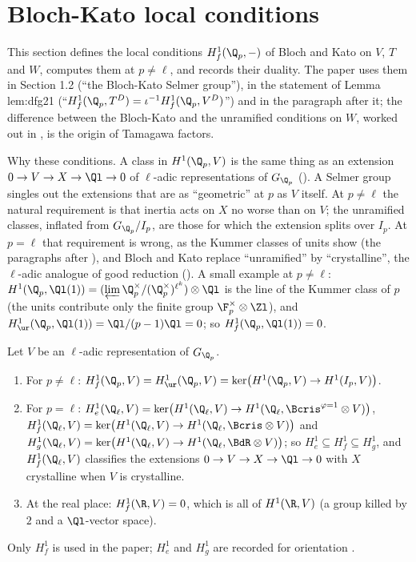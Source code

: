 \section{Bloch-Kato local conditions}\label{sec:blochkato:conditions}

This section defines the local conditions $H^1_f(\Q_p,-)$ of Bloch and Kato on $V$, $T$ and $W$, computes them at $p\ne\ell$, and records their duality.
The paper uses them in Section 1.2 (``the Bloch-Kato Selmer group''), in the statement of Lemma lem:dfg21 (``$H^1_f(\Q_p,T^D)=\iota^{-1}H^1_f(\Q_p,V^D)$'') and
in the paragraph after it; the difference between the Bloch-Kato and the unramified conditions on $W$, worked out in , is the
origin of Tamagawa factors.

Why these conditions. A class in $H^1(\Q_p,V)$ is the same thing as an extension $0\to V\to X\to\Ql\to0$ of $\ell$-adic representations of $G_{\Q_p}$ (). A
Selmer group singles out the extensions that are as ``geometric'' at $p$ as $V$ itself. At $p\ne\ell$ the natural requirement is that inertia acts on $X$ no worse than
on $V$; the unramified classes, inflated from $G_{\Q_p}/I_p$, are those for which the extension splits over $I_p$. At $p=\ell$ that requirement is wrong, as the Kummer
classes of units show (the paragraphs after ), and Bloch and Kato replace ``unramified'' by ``crystalline'', the $\ell$-adic
analogue of good reduction (). A small example at $p\ne\ell$: $H^1(\Q_p,\Ql(1))=(\varprojlim\Q_p^\times/(\Q_p^\times)^{\ell^k})\otimes\Ql$ is
the line of the Kummer class of $p$ (the units contribute only the finite group $\F_p^\times\otimes\Zl$), and $H^1_{\ur}(\Q_p,\Ql(1))=\Ql/(p-1)\Ql=0$; so $H^1_f(\Q_p,\Ql(1))=0$.

\begin{definition}\label{def:blochkato:local-conditions}
Let $V$ be an $\ell$-adic representation of $G_{\Q_p}$.
\begin{enumerate}[label=(\roman*)]
\item For $p\ne\ell$: $H^1_f(\Q_p,V)=H^1_{\ur}(\Q_p,V)=\ker\bigl(H^1(\Q_p,V)\to H^1(I_p,V)\bigr)$.
\item \sloppy For $p=\ell$: $H^1_e(\Q_\ell,V)=\ker\bigl(H^1(\Q_\ell,V)\to H^1(\Q_\ell,\Bcris^{\varphi=1}\otimes V)\bigr)$, $H^1_f(\Q_\ell,V)=\ker\bigl(H^1(\Q_\ell,V)\to H^1(\Q_\ell,\Bcris\otimes V)\bigr)$ and
$H^1_g(\Q_\ell,V)=\ker\bigl(H^1(\Q_\ell,V)\to H^1(\Q_\ell,\BdR\otimes V)\bigr)$; so $H^1_e\subseteq H^1_f\subseteq H^1_g$, and $H^1_f(\Q_\ell,V)$ classifies the extensions
$0\to V\to X\to\Ql\to0$ with $X$ crystalline when $V$ is crystalline.
\item At the real place: $H^1_f(\R,V)=0$, which is all of $H^1(\R,V)$ (a group killed by $2$ and a $\Ql$-vector space).
\end{enumerate}
Only $H^1_f$ is used in the paper; $H^1_e$ and $H^1_g$ are recorded for orientation \cite[Section 3]{BlochKato}.
\end{definition}

